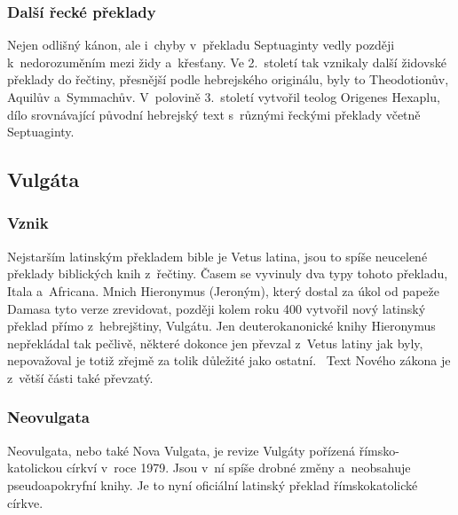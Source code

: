 \documentclass[a4paper,11pt,oneside]{article}
\begin{document}
\subsubsection{Další řecké překlady}
Nejen odlišný kánon, ale i~chyby v~překladu Septuaginty vedly později k~nedorozuměním mezi židy a~křesťany. Ve 2.~století tak vznikaly další židovské překlady do řečtiny, přesnější podle hebrejského originálu, byly to Theodotionův, Aquilův a~Symmachův. V~polovině 3.~století vytvořil teolog Origenes Hexaplu, dílo srovnávající původní hebrejský text s~různými řeckými překlady včetně Septuaginty.~\cite[strana 18]{cep}

\subsection{Vulgáta}
\subsubsection{Vznik}
Nejstarším latinským překladem bible je Vetus latina, jsou to spíše neucelené překlady biblických knih z~řečtiny. Časem se vyvinuly dva typy tohoto překladu, Itala a~Africana. Mnich Hieronymus (Jeroným), který dostal za úkol od papeže Damasa tyto verze zrevidovat, později kolem roku 400 vytvořil nový latinský překlad přímo z~hebrejštiny, Vulgátu. Jen deuterokanonické knihy Hieronymus nepřekládal tak pečlivě, některé dokonce jen převzal z~Vetus latiny jak byly, nepovažoval je totiž zřejmě za tolik důležité jako ostatní.~\cite[strana 18-19]{cep}  Text Nového zákona je z~větší části také převzatý.

\subsubsection{Neovulgata}
Neovulgata, nebo také Nova Vulgata, je revize Vulgáty pořízená římsko-katolickou církví v~roce 1979. Jsou v~ní spíše drobné změny a~neobsahuje pseudoapokryfní knihy. Je to nyní oficiální latinský překlad římskokatolické církve.~\cite[strana 19]{cep}
\end{document}
